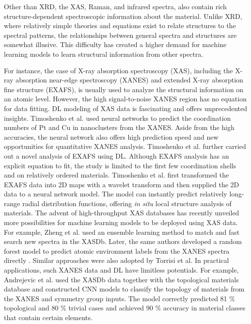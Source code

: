 \documentclass[pdflatex,sn-mathphys]{sn-jnl}%
\theoremstyle{thmstyleone}%
\theoremstyle{thmstyletwo}%
\theoremstyle{thmstylethree}%
\begin{document}
Other than XRD, the XAS, Raman, and infrared spectra, also contain rich structure-dependent spectroscopic information about the material. Unlike XRD, where relatively simple theories and equations exist to relate structures to the spectral patterns, the relationships between general spectra and structures are somewhat illusive. This difficulty has created a higher demand for machine learning models to learn structural information from other spectra.  

For instance, the case of X-ray absorption spectroscopy (XAS), including the X-ray absorption near-edge spectroscopy (XANES) and extended X-ray absorption fine structure (EXAFS), is usually used to analyze the structural information on an atomic level. However, the high signal-to-noise XANES region has no equation for data fitting. DL modeling of XAS data is fascinating and offers unprecedented insights. Timoshenko et al. used neural networks to predict the coordination numbers of Pt \cite{timoshenkoSupervisedMachineLearningBasedDetermination2017} and Cu \cite{timoshenkosubnano2018} in nanoclusters from the XANES. Aside from the high accuracies, the neural network also offers high prediction speed and new opportunities for quantitative XANES analysis. Timoshenko et al. \cite{timoshenkoNeuralNetworkApproach2018} further carried out a novel analysis of EXAFS using DL. Although EXAFS analysis has an explicit equation to fit, the study is limited to the first few coordination shells and on relatively ordered materials.  Timoshenko et al.  \cite{timoshenkoNeuralNetworkApproach2018} first transformed the EXAFS data into 2D maps with a wavelet transform and then supplied the 2D data to a neural network model. The model can instantly predict relatively long-range radial distribution functions, offering \emph{in situ} local structure analysis of materials. The advent of high-throughput XAS databases has recently unveiled more possibilities for machine learning models to be deployed using XAS data. For example, Zheng et al. \cite{zhengAutomatedGenerationEnsemblelearned2018} used an ensemble learning method to match and fast search new spectra in the XASDb. Later, the same authors developed a random forest model to predict atomic environment labels from the XANES spectra directly \cite{zhengRandomForestModels2020}. Similar approaches were also adopted by Torrisi et al. \cite{torrisiRandomForestMachine2020} In practical applications, such XANES data and DL have limitless potentials. For example, Andrejevic et al. \cite{andrejevic2020machine} used the XASDb data together with the topological materials database and constructed CNN models to classify the topology of materials from the XANES and symmetry group inputs. The model correctly predicted 81 \% topological and 80 \% trivial cases and achieved 90 \% accuracy in material classes that contain certain elements. 
\end{document}
